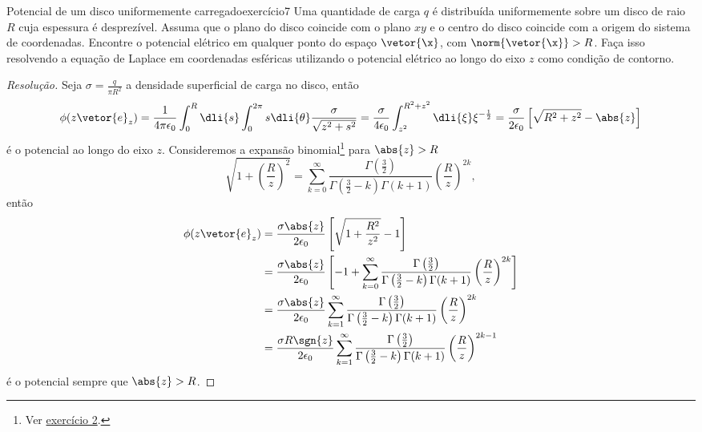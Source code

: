 \begin{exercício}{Potencial de um disco uniformemente carregado}{exercício7}
    Uma quantidade de carga \(q\) é distribuída uniformemente sobre um disco de raio \(R\) cuja espessura é desprezível. Assuma que o plano do disco coincide com o plano \(xy\) e o centro do disco coincide com a origem do sistema de coordenadas. Encontre o potencial elétrico em qualquer ponto do espaço \(\vetor{\x}\), com \(\norm{\vetor{\x}} > R\). Faça isso resolvendo a equação de Laplace em coordenadas esféricas utilizando o potencial elétrico ao longo do eixo \(z\) como condição de contorno.
\end{exercício}
\begin{proof}[Resolução]
    Seja \(\sigma = \frac{q}{\pi R^2}\) a densidade superficial de carga no disco, então
    \begin{equation*}
        \phi(z\vetor{e}_z) = \frac{1}{4\pi \epsilon_0} \int_0^R \dli{s}\int_0^{2\pi} s\dli{\theta}\frac{\sigma}{\sqrt{z^2 + s^2}} = \frac{\sigma}{4 \epsilon_0} \int_{z^2}^{R^2 + z^2} \dli{\xi} \xi^{-\frac12} =\frac{\sigma}{2 \epsilon_0} \left[\sqrt{R^2 + z^2} - \abs{z}\right]
    \end{equation*}
    é o potencial ao longo do eixo \(z\). Consideremos a expansão binomial\footnote{Ver \href{https://github.com/louisradial/4302307-fismat-ii/blob/main/lista de exercícios 2/lista2.pdf}{exercício 2}.} para \(\abs{z} > R\)
    \begin{equation*}
        \sqrt{1 + \left(\frac{R}{z}\right)^2} = \sum_{k=0}^\infty \frac{\Gamma\left(\frac32\right)}{\Gamma\left(\frac32- k\right)\Gamma(k+1)}\left(\frac{R}{z}\right)^{2k},
    \end{equation*}
    então
    \begin{align*}
        \phi(z \vetor{e}_z) &=\frac{\sigma \abs{z}}{2 \epsilon_0}\left[\sqrt{1 + \frac{R^2}{z^2}} - 1\right]\\
                            &= \frac{\sigma \abs{z}}{2 \epsilon_0}\left[-1 + \sum_{k=0}^\infty \frac{\Gamma\left(\frac32\right)}{\Gamma\left(\frac32- k\right)\Gamma(k+1)}\left(\frac{R}{z}\right)^{2k}\right]\\
                            &= \frac{\sigma \abs{z}}{2 \epsilon_0}\sum_{k = 1}^\infty \frac{\Gamma\left(\frac32\right)}{\Gamma\left(\frac32 - k\right) \Gamma(k + 1)}\left(\frac{R}{z}\right)^{2k}\\
                            &= \frac{\sigma R \sgn{z}}{2 \epsilon_0} \sum_{k = 1}^\infty \frac{\Gamma\left(\frac32\right)}{\Gamma\left(\frac32 - k\right) \Gamma(k + 1)}\left(\frac{R}{z}\right)^{2k-1}
    \end{align*}
    é o potencial sempre que \(\abs{z} > R\).


\end{proof}

